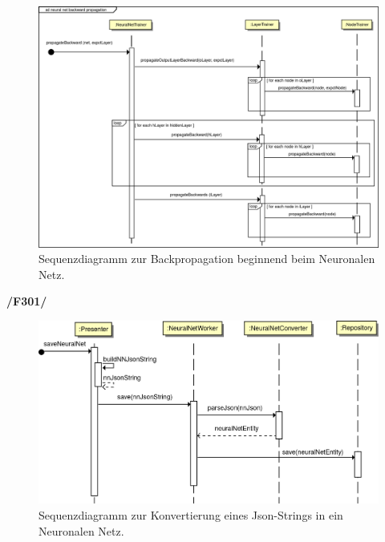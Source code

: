 \begin{figure}[H]
\begin{center}
\includegraphics[width=15cm]{Abbildungen/UML/jan/gradientdescent1.png}
\caption{Sequenzdiagramm zur Backpropagation beginnend beim Neuronalen Netz.}
\label{fig_sdBackpropagation}
\end{center}
\end{figure}

\textbf{/F301/} 
\begin{figure}[H]
\begin{center}
\includegraphics[width=15cm]{Abbildungen/UML/jan/convertJsonNNSD.png}
\caption{Sequenzdiagramm zur Konvertierung eines Json-Strings in ein Neuronalen Netz.}
\label{fig_sdBackpropagation}
\end{center}
\end{figure}
